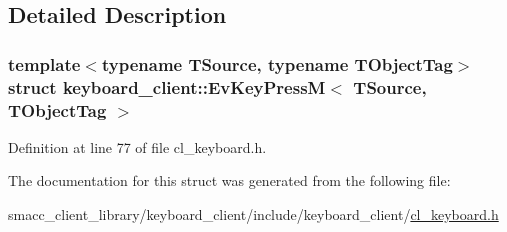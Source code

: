\subsection{Detailed Description}
\subsubsection*{template$<$typename T\+Source, typename T\+Object\+Tag$>$\newline
struct keyboard\+\_\+client\+::\+Ev\+Key\+Press\+M$<$ T\+Source, T\+Object\+Tag $>$}



Definition at line 77 of file cl\+\_\+keyboard.\+h.



The documentation for this struct was generated from the following file\+:\begin{DoxyCompactItemize}
\item 
smacc\+\_\+client\+\_\+library/keyboard\+\_\+client/include/keyboard\+\_\+client/\hyperlink{cl__keyboard_8h}{cl\+\_\+keyboard.\+h}\end{DoxyCompactItemize}
